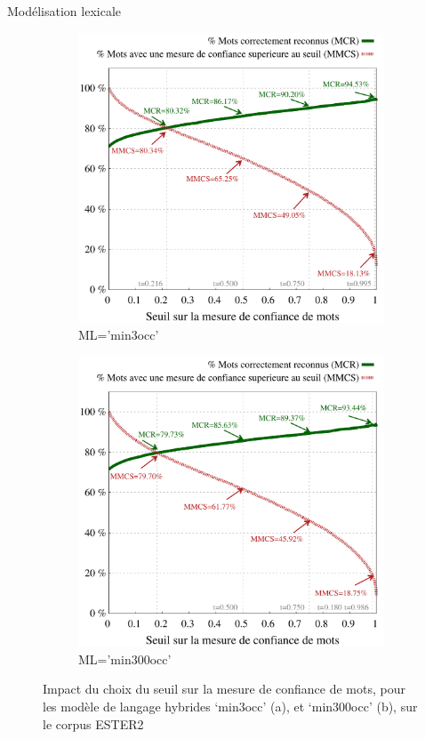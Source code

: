 \documentclass{style/these}
\begin{document}
\begin{part}{Modélisation lexicale}
\begin{figure}[h!]
\begin{subfigure}{0.5\textwidth}
\centering
\includegraphics[scale=0.41]{images/results/ESTER_combined_min3occ_words_CM.pdf}
\caption{ML='min3occ'}
\end{subfigure}
\begin{subfigure}{0.5\textwidth}
\centering
\includegraphics[scale=0.41]{images/results/ESTER_combined_min300occ_words_CM.pdf}
\caption{ML='min300occ'}
\end{subfigure}
\caption{Impact du choix du seuil sur la mesure de confiance de mots, pour les modèle de langage hybrides `min3occ' (a), et `min300occ' (b), sur le corpus ESTER2}
\label{Fig:MC-mots-ESTER2}
\end{figure}



\end{part}
\end{document}
